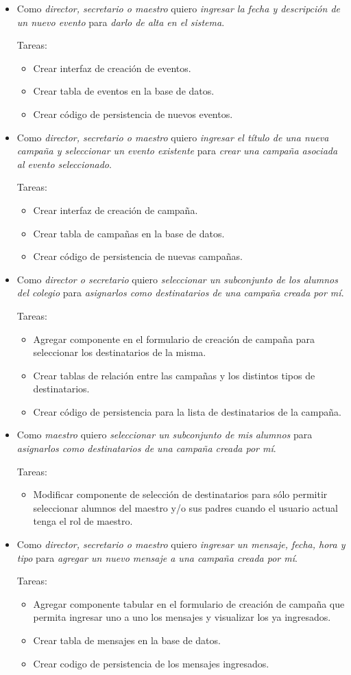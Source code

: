 \documentclass[a4paper, 10pt, twoside]{article}
\newenvironment{stories}{
  \begin{itemize}
}{
  \end{itemize}
}
\newcommand{\story}[3]{
  \item
  Como \emph{#1} quiero \emph{#2} para \emph{#3}.
}
\newenvironment{tasks}{
  Tareas:
  \begin{itemize}
}{
  \end{itemize}
}
\newcommand{\task}[1] {
  \item #1.
}
\begin{document}
\begin{stories}
  \story{director, secretario o maestro}
        {ingresar la fecha y descripción de un nuevo evento}
        {darlo de alta en el sistema}

  \begin{tasks}
    \task{Crear interfaz de creación de eventos}
    \task{Crear tabla de eventos en la base de datos}
    \task{Crear código de persistencia de nuevos eventos}
  \end{tasks}

  \story{director, secretario o maestro}
        {ingresar el título de una nueva campaña y seleccionar un evento existente}
        {crear una campaña asociada al evento seleccionado}

  \begin{tasks}
    \task{Crear interfaz de creación de campaña}
    \task{Crear tabla de campañas en la base de datos}
    \task{Crear código de persistencia de nuevas campañas}
  \end{tasks}

  \story{director o secretario}
        {seleccionar un subconjunto de los alumnos del colegio}
        {asignarlos como destinatarios de una campaña creada por mí}

  \begin{tasks}
    \task{Agregar componente en el formulario de creación de campaña para seleccionar los destinatarios de la misma}
    \task{Crear tablas de relación entre las campañas y los distintos tipos de destinatarios}
    \task{Crear código de persistencia para la lista de destinatarios de la campaña}
  \end{tasks}

  \story{maestro}
        {seleccionar un subconjunto de mis alumnos}
        {asignarlos como destinatarios de una campaña creada por mí}

  \begin{tasks}
    \task{Modificar componente de selección de destinatarios para sólo permitir seleccionar alumnos del maestro y/o sus padres cuando el usuario actual tenga el rol de maestro}
  \end{tasks}

  \story{director, secretario o maestro}
        {ingresar un mensaje, fecha, hora y tipo}
        {agregar un nuevo mensaje a una campaña creada por mí}

  \begin{tasks}
    \task{Agregar componente tabular en el formulario de creación de campaña que permita ingresar uno a uno los mensajes y visualizar los ya ingresados}
    \task{Crear tabla de mensajes en la base de datos}
    \task{Crear codigo de persistencia de los mensajes ingresados}
  \end{tasks}


\end{stories}
\end{document}
